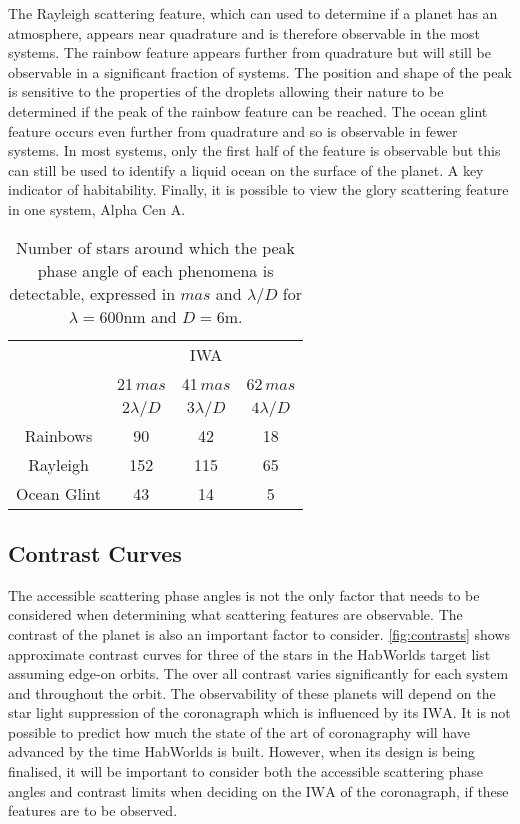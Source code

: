 \documentclass[
    usenatbib,
]{mnras}
\newcommand{\IWA}{\ensuremath{\mathrm{IWA}}}
\newcommand{\hwo}{HabWorlds}
\begin{document}
The Rayleigh scattering feature, which can used to determine if a planet has an atmosphere, appears near quadrature and is therefore observable in the most systems.
%
The rainbow feature appears further from quadrature but will still be observable in a significant fraction of systems.
%
The position and shape of the peak is sensitive to the properties of the droplets allowing their nature to be determined if the peak of the rainbow feature can be reached.
%
The ocean glint feature occurs even further from quadrature and so is observable in fewer systems. 
%
In most systems, only the first half of the feature is observable but this can still be used to identify a liquid ocean on the surface of the planet.
%
A key indicator of habitability. Finally, it is possible to view the glory scattering feature in one system, Alpha Cen A.

\begin{table}
    \centering
    \caption{
        Number of stars around which the peak phase angle of each phenomena is detectable, expressed in $mas$ and $\lambda/D$ for $\lambda=600$nm and  $D=6$m. 
    }
    \label{tab:nstars_detect}
    \begin{tabular}{ c c c c } 
    \toprule
      & \multicolumn{3}{c}{IWA}
    \\
     & 21\,$mas$ & 41\,$mas$ & 62\,$mas$
    \\
     & $2\lambda/D$ & $3\lambda/D$ & $4\lambda/D$ 
    \\
    \midrule
    \midrule
    Rainbows & 90 & 42 & 18 \\
    Rayleigh & 152 & 115 & 65 \\
    Ocean Glint & 43 & 14 & 5 \\
    \bottomrule
    \end{tabular}
\end{table}


\subsection{Contrast Curves}
\label{sec:results_contrast}

The accessible scattering phase angles is not the only factor that needs to be considered when determining what scattering features are observable.
%
The contrast of the planet is also an important factor to consider.
%
\cref{fig:contrasts} shows approximate contrast curves for three of the stars in the \hwo{} target list assuming edge-on orbits.
%
The over all contrast varies significantly for each system and throughout the orbit.
%
The observability of these planets will depend on the star light suppression of the coronagraph which is influenced by its \IWA{}.
%
It is not possible to predict how much the state of the art of coronagraphy will have advanced by the time \hwo{} is built.
%
However, when its design is being finalised, it will be important to consider both the accessible scattering phase angles and contrast limits when deciding on the \IWA{} of the coronagraph, if these features are to be observed.
\end{document}
